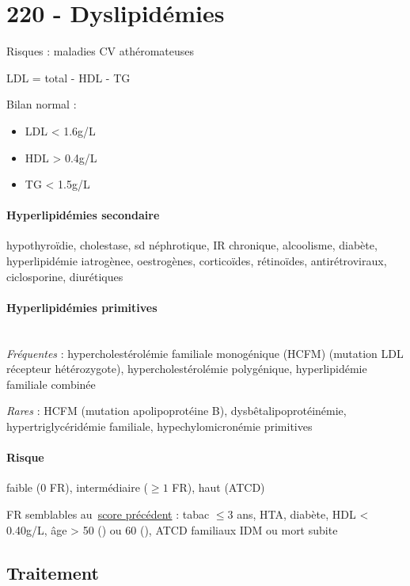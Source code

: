 \section{220 - Dyslipidémies}%
\label{sec:220_dyslipidemies}

Risques : maladies CV athéromateuses

LDL = total - HDL - \gls{TG}

Bilan normal : \begin{itemize}
  \item LDL  < 1.6g/L
  \item HDL  > 0.4g/L
  \item TG  < 1.5g/L
\end{itemize}

\paragraph{Hyperlipidémies secondaire } hypothyroïdie, cholestase, sd néphrotique, IR chronique, alcoolisme,
diabète, hyperlipidémie iatrogènee, oestrogènes, corticoïdes, rétinoïdes,
antirétroviraux, ciclosporine, diurétiques

\paragraph{Hyperlipidémies primitives}\mbox{}\\
\textit{Fréquentes}  : hypercholestérolémie familiale monogénique (HCFM) (mutation LDL récepteur
hétérozygote), hypercholestérolémie polygénique, hyperlipidémie familiale
combinée

\textit{Rares}  : HCFM (mutation apolipoprotéine B),
dysbêtalipoprotéinémie, hypertriglycéridémie familiale, hypechylomicronémie
primitives

\paragraph{Risque} faible (0 FR), intermédiaire ($\ge 1$ FR), haut (ATCD)

FR semblables au~\hyperref[subsec:fr]{score précédent} : tabac $\le 3$ ans, HTA, diabète, HDL < 0.40g/L, âge > 50
(\male) ou 60 (\female), ATCD familiaux IDM ou mort subite

\subsection{Traitement}

